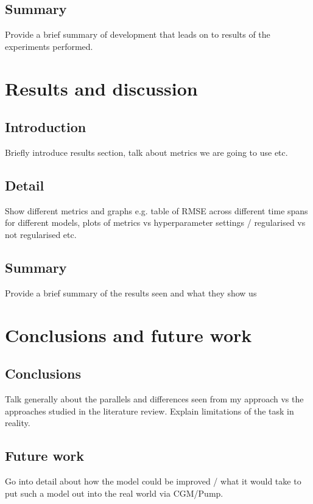 	\subsection{Summary}
        Provide a brief summary of development that leads on to results of the experiments performed.


\section{Results and discussion} %
    \subsection{Introduction}
        Briefly introduce results section, talk about metrics we are going to use etc.
	
	\subsection{Detail}
        Show different metrics and graphs e.g. table of RMSE across different time spans for different models, plots of metrics vs hyperparameter settings / regularised vs not regularised etc.
	
	\subsection{Summary}
        Provide a brief summary of the results seen and what they show us



\section{Conclusions and future work} %
    \subsection{Conclusions}
        Talk generally about the parallels and differences seen from my approach vs the approaches studied in the literature review. Explain limitations of the task in reality.
	
	\subsection{Future work}
        Go into detail about how the model could be improved / what it would take to put such a model out into the real world via CGM/Pump.
    


